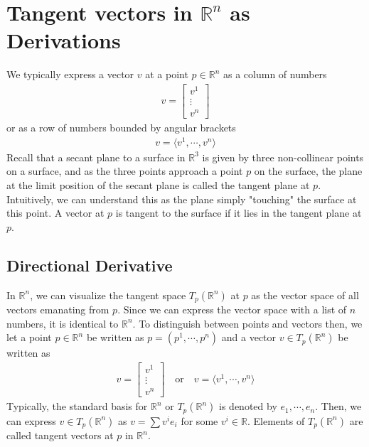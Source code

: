 \documentclass{article}
\newcommand{\R}{\mathbb{R}}
\begin{document}
	\section*{Tangent vectors in $\R^n$ as Derivations}
	We typically express a vector $v$ at a point $p \in \R^n$ as a column of numbers
	\begin{gather*}
		v = \begin{bmatrix}
			v^1 \\
			\vdots \\
			v^n
		\end{bmatrix}
	\end{gather*}
	or as a row of numbers bounded by angular brackets
	\begin{gather*}
		v = \langle v^1, \cdots, v^n \rangle
	\end{gather*}
	Recall that a secant plane to a surface in $\R^3$ is given by three non-collinear points on a surface, and as the three points approach a point $p$ on the surface, the plane at the limit position of the secant plane is called the tangent plane at $p$. Intuitively, we can understand this as the plane simply "touching" the surface at this point. A vector at $p$ is tangent to the surface if it lies in the tangent plane at $p$.
	
	
	\subsection*{Directional Derivative}
	In $\R^n$, we can visualize the tangent space $T_p(\R^n)$ at $p$ as the vector space of all vectors emanating from $p$. Since we can express the vector space with a list of $n$ numbers, it is identical to $\R^n$. To distinguish between points and vectors then, we let a point $p \in \R^n$ be written as $p = \left( p^1, \cdots, p^n \right)$ and a vector $v \in T_p(\R^n)$ be written as
	\begin{gather*}
		v = \begin{bmatrix}
			v^1 \\
			\vdots \\
			v^n
		\end{bmatrix} \quad \text{or} \quad 
		v = \langle v^1, \cdots, v^n \rangle
	\end{gather*}
	Typically, the standard basis for $\R^n$ or $T_p(\R^n)$ is denoted by $e_1, \cdots, e_n$. Then, we can express $v \in T_p(\R^n)$ as $v = \sum v^i e_i$ for some $v^i \in \R$. Elements of $T_p(\R^n)$ are called tangent vectors at $p$ in $\R^n$.
	
\end{document}
